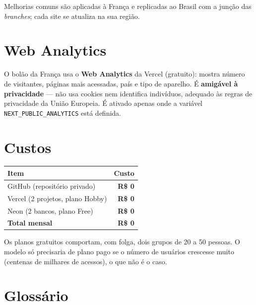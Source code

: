 \documentclass[11pt,a4paper]{article}
\begin{document}
\noindent Melhorias comuns são aplicadas à França e replicadas ao Brasil com a
junção das \textit{branches}; cada site se atualiza na sua região.

\section{Web Analytics}

O bolão da França usa o \textbf{Web Analytics} da Vercel (gratuito): mostra
número de visitantes, páginas mais acessadas, país e tipo de aparelho. É
\textbf{amigável à privacidade} --- não usa cookies nem identifica indivíduos,
adequado às regras de privacidade da União Europeia. É ativado apenas onde a
variável \texttt{NEXT\_PUBLIC\_ANALYTICS} está definida.

\section{Custos}

\begin{center}
\begin{tabularx}{\textwidth}{@{}L >{\bfseries}r@{}}
\toprule
\normalfont Item & Custo \\
\midrule
GitHub (repositório privado) & R\$ 0 \\
Vercel (2 projetos, plano Hobby) & R\$ 0 \\
Neon (2 bancos, plano Free) & R\$ 0 \\
\midrule
\normalfont\bfseries Total mensal & R\$ 0 \\
\bottomrule
\end{tabularx}
\end{center}

\noindent Os planos gratuitos comportam, com folga, dois grupos de 20 a 50
pessoas. O modelo só precisaria de plano pago se o número de usuários crescesse
muito (centenas de milhares de acessos), o que não é o caso.

\section{Glossário}
\end{document}
